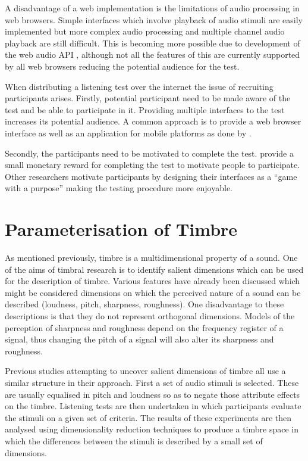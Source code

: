 			A disadvantage of a web implementation is the limitations of audio processing in web browsers.
			Simple interfaces which involve playback of audio stimuli are easily implemented but more complex
			audio processing and multiple channel audio playback are still difficult.  This is becoming more
			possible due to development of the web audio API \citep{adenot2015web}, although not all the
			features of this are currently supported by all web browsers reducing the potential audience for the
			test.

			When distributing a listening test over the internet the issue of recruiting participants arises.
			Firstly, potential participant need to be made aware of the test and be able to participate in it.
			Providing multiple interfaces to the test increases its potential audience. A common approach is to
			provide a web browser interface as well as an application for mobile platforms as done by
			\citet{huq2010crowdsourcing}.

			Secondly, the participants need to be motivated to complete the test.
			\citet{cartwright2013socialeq} provide a small monetary reward for completing the test to motivate
			people to participate. Other researchers motivate participants by designing their interfaces as a
			``game with a purpose'' \citep{law2007tagatune, huq2010crowdsourcing, burgoyne2013hooked} making the
			testing procedure more enjoyable.

\section{Parameterisation of Timbre}
\label{sec:Timbre-Parameterisation}
	As mentioned previously, timbre is a multidimensional property of a sound. One of the aims of timbral research is to
	identify salient dimensions which can be used for the description of timbre. Various features have already been
	discussed which might be considered dimensions on which the perceived nature of a sound can be described (loudness,
	pitch, sharpness, roughness). One disadvantage to these descriptions is that they do not represent orthogonal
	dimensions. Models of the perception of sharpness and roughness depend on the frequency register of a signal, thus
	changing the pitch of a signal will also alter its sharpness and roughness.

	Previous studies attempting to uncover salient dimensions of timbre all use a similar structure in their approach.
	First a set of audio stimuli is selected. These are usually equalised in pitch and loudness so as to negate those
	attribute effects on the timbre. Listening tests are then undertaken in which participants evaluate the stimuli on a
	given set of criteria. The results of these experiments are then analysed using dimensionality reduction techniques
	to produce a timbre space in which the differences between the stimuli is described by a small set of dimensions.

